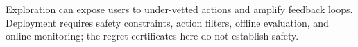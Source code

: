 Exploration can expose users to under-vetted actions and amplify feedback loops.
Deployment requires safety constraints, action filters, offline evaluation, and
online monitoring; the regret certificates here do not establish safety.
